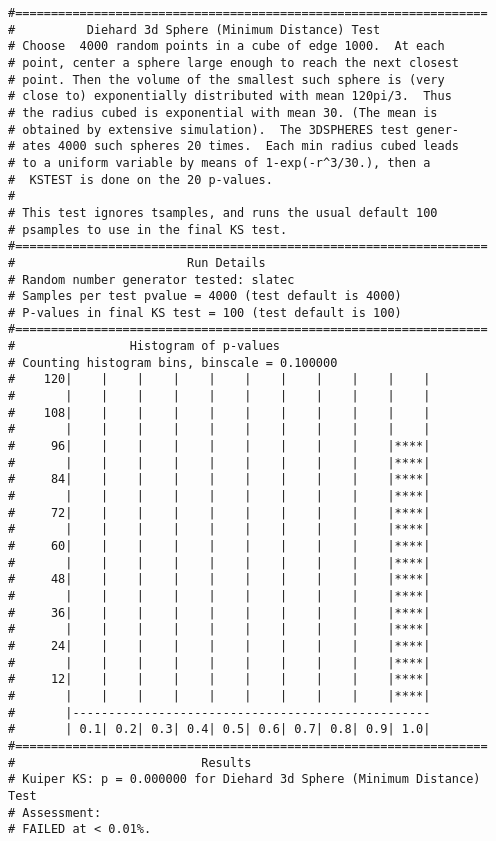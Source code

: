 \documentclass[12pt]{book}
\begin{document}
{\begin{verbatim}
#==================================================================
#          Diehard 3d Sphere (Minimum Distance) Test
# Choose  4000 random points in a cube of edge 1000.  At each   
# point, center a sphere large enough to reach the next closest 
# point. Then the volume of the smallest such sphere is (very   
# close to) exponentially distributed with mean 120pi/3.  Thus  
# the radius cubed is exponential with mean 30. (The mean is    
# obtained by extensive simulation).  The 3DSPHERES test gener- 
# ates 4000 such spheres 20 times.  Each min radius cubed leads 
# to a uniform variable by means of 1-exp(-r^3/30.), then a     
#  KSTEST is done on the 20 p-values.                           
#
# This test ignores tsamples, and runs the usual default 100
# psamples to use in the final KS test.
#==================================================================
#                        Run Details
# Random number generator tested: slatec
# Samples per test pvalue = 4000 (test default is 4000)
# P-values in final KS test = 100 (test default is 100)
#==================================================================
#                Histogram of p-values
# Counting histogram bins, binscale = 0.100000
#    120|    |    |    |    |    |    |    |    |    |    |
#       |    |    |    |    |    |    |    |    |    |    |
#    108|    |    |    |    |    |    |    |    |    |    |
#       |    |    |    |    |    |    |    |    |    |    |
#     96|    |    |    |    |    |    |    |    |    |****|
#       |    |    |    |    |    |    |    |    |    |****|
#     84|    |    |    |    |    |    |    |    |    |****|
#       |    |    |    |    |    |    |    |    |    |****|
#     72|    |    |    |    |    |    |    |    |    |****|
#       |    |    |    |    |    |    |    |    |    |****|
#     60|    |    |    |    |    |    |    |    |    |****|
#       |    |    |    |    |    |    |    |    |    |****|
#     48|    |    |    |    |    |    |    |    |    |****|
#       |    |    |    |    |    |    |    |    |    |****|
#     36|    |    |    |    |    |    |    |    |    |****|
#       |    |    |    |    |    |    |    |    |    |****|
#     24|    |    |    |    |    |    |    |    |    |****|
#       |    |    |    |    |    |    |    |    |    |****|
#     12|    |    |    |    |    |    |    |    |    |****|
#       |    |    |    |    |    |    |    |    |    |****|
#       |--------------------------------------------------
#       | 0.1| 0.2| 0.3| 0.4| 0.5| 0.6| 0.7| 0.8| 0.9| 1.0|
#==================================================================
#                          Results
# Kuiper KS: p = 0.000000 for Diehard 3d Sphere (Minimum Distance) Test
# Assessment:
# FAILED at < 0.01%.


\end{verbatim}}
\end{document}
